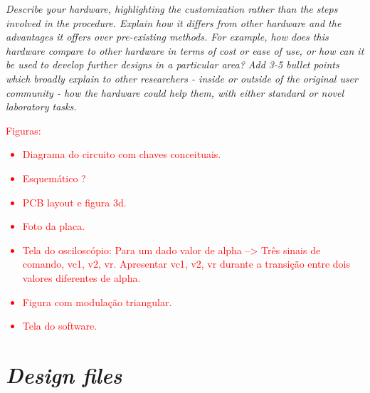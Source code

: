 \documentclass[11pt, letterpaper]{article}
\begin{document}
\textit{Describe your hardware, highlighting the customization rather than the steps involved in the procedure. Explain how it differs from other hardware and the advantages it offers over pre-existing methods. For example, how does this hardware compare to other hardware in terms of cost or ease of use, or how can it be used to develop further designs in a particular area? 
\vskip 0.3cm \noindent
Add 3-5 bullet points which broadly explain to other researchers - inside or outside of the original user community - how the hardware could help them, with either standard or novel laboratory tasks.}

\bigskip

\textcolor{red}{Figuras: 
\begin{itemize}
\item Diagrama do circuito com chaves conceituais.
\item Esquemático ?
\item PCB layout e figura 3d. 
\item Foto da placa.
\item Tela do osciloscópio: Para um dado valor de alpha --> Três sinais de comando, vc1, v2, vr. Apresentar vc1, v2, vr durante a transição entre dois valores diferentes de alpha. 
\item Figura com modulação triangular.
\item Tela do software.
\end{itemize}
}

\section*{\textit{Design files}}

\end{document}
